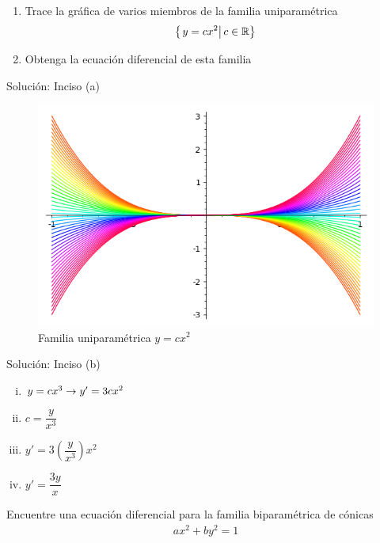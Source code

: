 

\begin{resuelto}
	\begin{enumerate}
		\item Trace la gráfica de varios miembros de la familia uniparamétrica $$\left\{ \left.y=cx^2 \right| c\in \mathbb{R} \right\}$$
		\item Obtenga la ecuación diferencial de esta familia
	\end{enumerate}
\end{resuelto}


{Solución: Inciso (a)}
\begin{figure}
	\centering
	\includegraphics[height=.5\textheight,keepaspectratio=true]{./edo/solved_problem_02-06.png}
	\caption{Familia uniparamétrica $y=cx^2$}
	\label{fig:solved0206}
\end{figure}


{Solución: Inciso (b)}
\begin{enumerate}[(i)]
	\item  $y=cx^3 \rightarrow y'=3cx^{2}$
	\item $c=\dfrac{y}{x^3}$
	\item $y'=3\left( \dfrac{y}{x^3} \right)x^2$
	\item $y'=\dfrac{3y}{x}$
\end{enumerate}


\begin{resuelto}

	Encuentre una ecuación diferencial para la familia biparamétrica de cónicas
	\begin{align*}
		ax^{2}+by^{2}=1
	\end{align*}

\end{resuelto}


